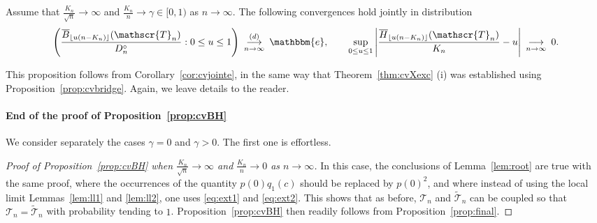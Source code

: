 \documentclass[AHL,XML,longabstracts,Unicode]{cedram}
\def\Dcn{D^{\circ}_{n}}
\def\oB{\overline{B}}
\def\oH{\overline{H}}
\def\tTs{\tilde{\Ts}}
\def\Ts{\mathscr{T}}
\begin{document}
\begin{proposition}
\label{prop:final}
Assume that $\frac{K_{n}}{\sqrt{n}} \rightarrow   \infty$ and   $\tfrac{K_{n}}{n}  \rightarrow \gamma \in [0,1)$ as $n \rightarrow \infty$. The following convergences hold jointly in distribution \[  \left(  \frac{\oB_{\lfloor u (n-K_{n}) \rfloor}(\Ts_{n})}{ \Dcn} : 0\leq u \leq 1\right)  \ \mathop{\longrightarrow}^{(d)}_{n \rightarrow \infty} \ \mathbbm{e}, \qquad  \sup_{0 \leq u \leq 1} \left|   \frac{\oH_{ \lfloor u (n-K_{n}) \rfloor  }(\Ts_{n})}{K_{n}}-u\right|  \ \mathop{\longrightarrow}_{n \rightarrow \infty} \ 0.\]
\end{proposition}
This proposition follows from Corollary~\ref{cor:cvjointe},
in the same way that Theorem~\ref{thm:cvXexc} (i) was established using Proposition~\ref{prop:cvbridge}.
Again, we leave details to the reader.


\medskip

\paragraph*{End of the proof of Proposition~\ref{prop:cvBH}}

We consider separately the cases $\gamma=0$ and $\gamma>0$.
The first one is effortless.

\begin{proof}[Proof of Proposition~\ref{prop:cvBH} when  $\tfrac{K_{n}}{\sqrt{n}} \rightarrow \infty$ and $ \tfrac{K_{n}}{n}  \rightarrow 0$ as $n \rightarrow \infty$] In this case, the conclusions of Lemma~\ref{lem:root} are true with the same proof, where the occurrences of the quantity $p(0) q_{1}(c)$ should be replaced by $p(0)^{2}$, and where instead of using the local limit Lemmas~\ref{lem:ll1} and \ref{lem:ll2}, one uses \eqref{eq:ext1} and \eqref{eq:ext2}.  This shows that as before,   $\Ts_{n}$ and $\tTs _{n}$ can be coupled so that $\Ts_{n}=\tTs_{n}$ with probability tending to $1$.  Proposition~\ref{prop:cvBH} then readily follows from Proposition~\ref{prop:final}.
\end{proof}
\end{document}
